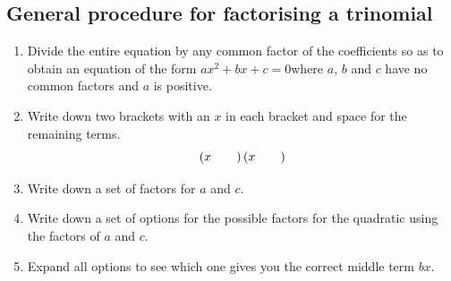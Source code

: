 \subsection*{General procedure for factorising a trinomial}
\nopagebreak
\label{m39394*id276561}\begin{enumerate}[itemsep=5pt, label=\textbf{\arabic*}. ] 
\label{m39394*uid21}\item Divide the entire equation by any common factor of the coefficients so as to obtain an equation of the form $a{x}^{2}+bx+c=0$\hspace{1ex}where $a$, $b$ and $c$ have no common factors and $a$ is positive.
\label{m39394*uid22}\item Write down two brackets with an $x$ in each bracket and space for the remaining terms.
\label{m39394*uid23}\nopagebreak\noindent{}
\begin{equation*}
\left(x\phantom{\rule{2.em}{0ex}}\right)\left(x\phantom{\rule{2.em}{0ex}}\right)
\end{equation*}
\label{m39394*uid24}\item Write down a set of factors for $a$ and $c$.
\label{m39394*uid25}\item Write down a set of options for the possible factors for the quadratic using the factors of $a$ and $c$.
\label{m39394*uid26}\item Expand all options to see which one gives you the correct middle term $bx$.
\end{enumerate}
\label{m39394*id276779}


\par

